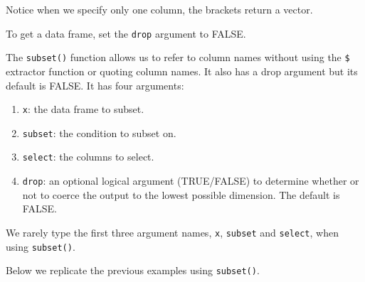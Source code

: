 \documentclass[
]{book}
\newenvironment{Shaded}{\begin{snugshade}}{\end{snugshade}}
\newcommand{\ConstantTok}[1]{\textcolor[rgb]{0.00,0.00,0.00}{#1}}
\newcommand{\DecValTok}[1]{\textcolor[rgb]{0.00,0.00,0.81}{#1}}
\newcommand{\FloatTok}[1]{\textcolor[rgb]{0.00,0.00,0.81}{#1}}
\newcommand{\NormalTok}[1]{#1}
\newcommand{\OtherTok}[1]{\textcolor[rgb]{0.56,0.35,0.01}{#1}}
\newcommand{\SpecialCharTok}[1]{\textcolor[rgb]{0.00,0.00,0.00}{#1}}
\newcommand{\StringTok}[1]{\textcolor[rgb]{0.31,0.60,0.02}{#1}}
\providecommand{\tightlist}{%
  \setlength{\itemsep}{0pt}\setlength{\parskip}{0pt}}
\begin{document}
Notice when we specify only one column, the brackets return a vector.

\begin{Shaded}
\end{Shaded}

To get a data frame, set the \texttt{drop} argument to FALSE.

\begin{Shaded}
\end{Shaded}

The \texttt{subset()} function allows us to refer to column names without using the \texttt{\$} extractor function or quoting column names. It also has a drop argument but its default is FALSE. It has four arguments:

\begin{enumerate}
\def\labelenumi{\arabic{enumi}.}
\tightlist
\item
  \texttt{x}: the data frame to subset.
\item
  \texttt{subset}: the condition to subset on.
\item
  \texttt{select}: the columns to select.
\item
  \texttt{drop}: an optional logical argument (TRUE/FALSE) to determine whether or not to coerce the output to the lowest possible dimension. The default is FALSE.
\end{enumerate}

We rarely type the first three argument names, \texttt{x}, \texttt{subset} and \texttt{select}, when using \texttt{subset()}.

Below we replicate the previous examples using \texttt{subset()}.
\end{document}
